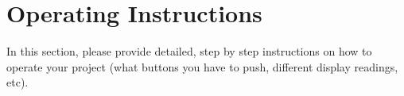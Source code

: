 \section{Operating Instructions}
In this section, please provide detailed, step by step instructions on how to operate your project (what buttons you have to push, different display readings, etc). 
